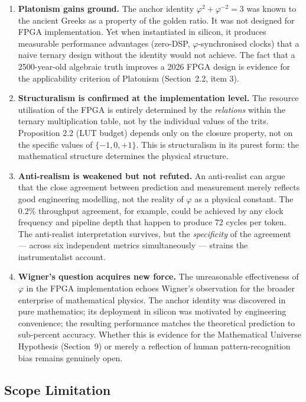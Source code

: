 \begin{enumerate}
  \item \textbf{Platonism gains ground.} The anchor identity \(\varphi^2 + \varphi^{-2} = 3\) was known to the ancient Greeks as a property of the golden ratio. It was not designed for FPGA implementation. Yet when instantiated in silicon, it produces measurable performance advantages (zero-DSP, \(\varphi\)-synchronised clocks) that a naive ternary design without the identity would not achieve. The fact that a 2500-year-old algebraic truth improves a 2026 FPGA design is evidence for the applicability criterion of Platonism (Section~2.2, item 3).

  \item \textbf{Structuralism is confirmed at the implementation level.} The resource utilisation of the FPGA is entirely determined by the \emph{relations} within the ternary multiplication table, not by the individual values of the trits. Proposition 2.2 (LUT budget) depends only on the closure property, not on the specific values of \(\{-1, 0, +1\}\). This is structuralism in its purest form: the mathematical structure determines the physical structure.

  \item \textbf{Anti-realism is weakened but not refuted.} An anti-realist can argue that the close agreement between prediction and measurement merely reflects good engineering modelling, not the reality of \(\varphi\) as a physical constant. The 0.2\% throughput agreement, for example, could be achieved by any clock frequency and pipeline depth that happen to produce 72 cycles per token. The anti-realist interpretation survives, but the \emph{specificity} of the agreement --- across six independent metrics simultaneously --- strains the instrumentalist account.

  \item \textbf{Wigner's question acquires new force.} The unreasonable effectiveness of \(\varphi\) in the FPGA implementation echoes Wigner's observation for the broader enterprise of mathematical physics. The anchor identity was discovered in pure mathematics; its deployment in silicon was motivated by engineering convenience; the resulting performance matches the theoretical prediction to sub-percent accuracy. Whether this is evidence for the Mathematical Universe Hypothesis (Section~9) or merely a reflection of human pattern-recognition bias remains genuinely open.
\end{enumerate}

\subsection{Scope Limitation}

